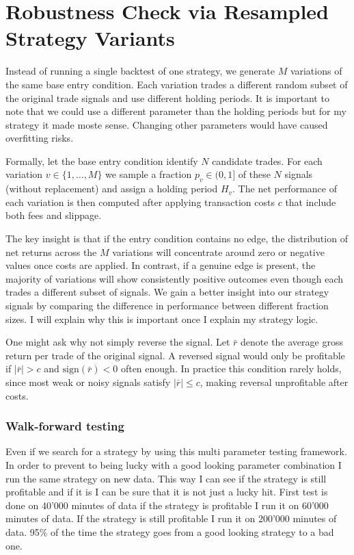 \documentclass[12pt]{article}
\begin{document}
\newpage
\section{Robustness Check via Resampled Strategy Variants}

Instead of running a single backtest of one strategy, we generate $M$ variations of the same base entry condition. Each variation trades a different random subset of the original trade signals and use different holding periods. It is important to note that we could use a different parameter than the holding periods but for my strategy it made moste sense. Changing other parameters would have caused overfitting risks.

Formally, let the base entry condition identify $N$ candidate trades. For each variation $v \in \{1,\dots,M\}$ we sample a fraction $p_v \in (0,1]$ of these $N$ signals (without replacement) and assign a holding period $H_v$. The net performance of each variation is then computed after applying transaction costs $c$ that include both fees and slippage.

The key insight is that if the entry condition contains no edge, the distribution of net returns across the $M$ variations will concentrate around zero or negative values once costs are applied. In contrast, if a genuine edge is present, the majority of variations will show consistently positive outcomes even though each trades a different subset of signals. We gain a better insight into our strategy signals by comparing the difference in performance between different fraction sizes. I will explain why this is important once I explain my strategy logic.

One might ask why not simply reverse the signal. Let $\bar{r}$ denote the average gross return per trade of the original signal. A reversed signal would only be profitable if $|\bar{r}| > c$ and $\mathrm{sign}(\bar{r}) < 0$ often enough. In practice this condition rarely holds, since most weak or noisy signals satisfy $|\bar{r}| \leq c$, making reversal unprofitable after costs.


\subsubsection*{Walk-forward testing}
Even if we search for a strategy by using this multi parameter testing framework. In order to prevent to being lucky with a good looking parameter combination I run the same strategy on new data. This way I can see if the strategy is still profitable and if it is I can be sure that it is not just a lucky hit.
First test is done on 40'000 minutes of data if the strategy is profitable I run it on 60'000 minutes of data. If the strategy is still profitable I run it on 200'000 minutes of data. 95\% of the time the strategy goes from a good looking strategy to a bad one.
\end{document}
